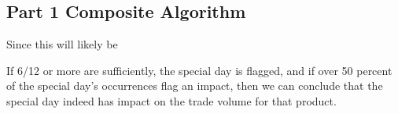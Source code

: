 \documentclass[11pt]{article}
\begin{document}
\subsection*{Part 1 Composite Algorithm}
Since this will likely be


If 6/12 or more are sufficiently, the special day is flagged, and if over 50 percent of the special day's occurrences flag an impact, then we can conclude that the special day indeed has impact on the trade volume for that product.
  
\end{document}

